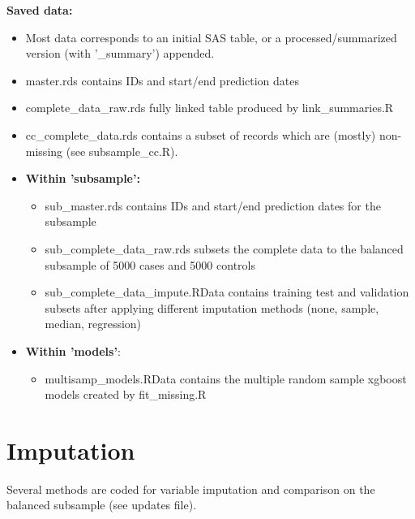 \documentclass[12pt]{article}
\begin{document}
{\bf Saved data:}
\begin{itemize}
  \item Most data corresponds to an initial SAS table, or a processed/summarized version (with '\_summary') appended.
  \item master.rds contains IDs and start/end prediction dates
  \item complete\_data\_raw.rds fully linked table produced by link\_summaries.R
  \item cc\_complete\_data.rds contains a subset of records which are (mostly) non-missing (see subsample\_cc.R).
  \item {\bf Within 'subsample':}
  \begin{itemize}
    \item sub\_master.rds contains IDs and start/end prediction dates for the subsample
    \item sub\_complete\_data\_raw.rds subsets the complete data to the balanced subsample of 5000 cases and 5000 controls
    \item sub\_complete\_data\_impute.RData contains training test and validation subsets after applying different imputation methods (none, sample, median, regression)
  \end{itemize}
  \item {\bf Within 'models'}:
  \begin{itemize}
    \item multisamp\_models.RData contains the multiple random sample xgboost models created by fit\_missing.R
  \end{itemize}
\end{itemize}

\section*{Imputation}

Several methods are coded for variable imputation and comparison on the balanced subsample (see updates file).
\end{document}
